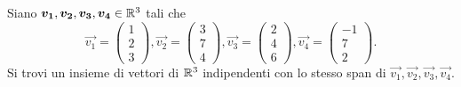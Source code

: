 \begin{example}
    Siano $\bm{v_1}, \bm{v_2}, \bm{v_3}, \bm{v_4} \in \mathbb{R}^3$ tali che \[
        \vec{v_1} = \begin{pmatrix}
            1 \\ 2 \\ 3
        \end{pmatrix}, \vec{v_2} = \begin{pmatrix}
            3 \\ 7 \\ 4
        \end{pmatrix}, \vec{v_3} = \begin{pmatrix}
            2 \\ 4 \\ 6
        \end{pmatrix}, \vec{v_4} = \begin{pmatrix}
            -1 \\ 7 \\ 2
        \end{pmatrix}.
    \] Si trovi un insieme di vettori di $\mathbb{R}^3$ indipendenti con lo stesso span di $\vec{v_1}, \vec{v_2}, \vec{v_3}, \vec{v_4}$.
\end{example}

